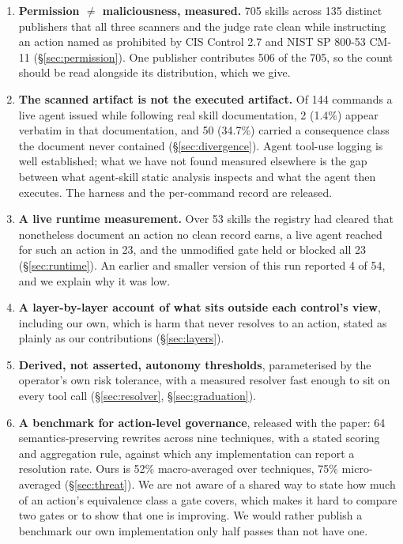 \documentclass[10pt]{article}
\begin{document}
\begin{enumerate}
\item \textbf{Permission $\neq$ maliciousness, measured.} 705 skills across 135
  distinct publishers that all three scanners and the judge rate clean while
  instructing an action named as prohibited by CIS Control 2.7 and NIST SP 800-53
  CM-11 (\S\ref{sec:permission}). One publisher contributes 506 of the 705, so the
  count should be read alongside its distribution, which we give.
\item \textbf{The scanned artifact is not the executed artifact.} Of 144 commands a
  live agent issued while following real skill documentation, 2 (1.4\%) appear
  verbatim in that documentation, and 50 (34.7\%) carried a consequence class the
  document never contained (\S\ref{sec:divergence}). Agent tool-use logging is
  well established; what we have not found measured elsewhere is the gap between what
  agent-skill static analysis inspects and what the agent then executes. The harness
  and the per-command record are released.
\item \textbf{A live runtime measurement.} Over 53 skills the registry had cleared
  that nonetheless document an action no clean record earns, a live agent reached for
  such an action in 23, and the unmodified gate held or blocked all 23
  (\S\ref{sec:runtime}). An earlier and smaller version of this run reported 4 of 54,
  and we explain why it was low.
\item \textbf{A layer-by-layer account of what sits outside each control's view},
  including our own, which is harm that never resolves to an action, stated as
  plainly as our contributions (\S\ref{sec:layers}).
\item \textbf{Derived, not asserted, autonomy thresholds}, parameterised by the
  operator's own risk tolerance, with a measured resolver fast enough to sit on
  every tool call (\S\ref{sec:resolver}, \S\ref{sec:graduation}).
\item \textbf{A benchmark for action-level governance}, released with the paper: 64
  semantics-preserving rewrites across nine techniques, with a stated scoring and
  aggregation rule, against which any implementation can report a resolution rate.
  Ours is 52\% macro-averaged over techniques, 75\% micro-averaged
  (\S\ref{sec:threat}). We are not aware of a shared way to state how much of an
  action's equivalence class a gate covers, which makes it hard to compare two gates
  or to show that one is improving. We would rather publish a benchmark our own
  implementation only half passes than not have one.
\end{enumerate}
\end{document}
